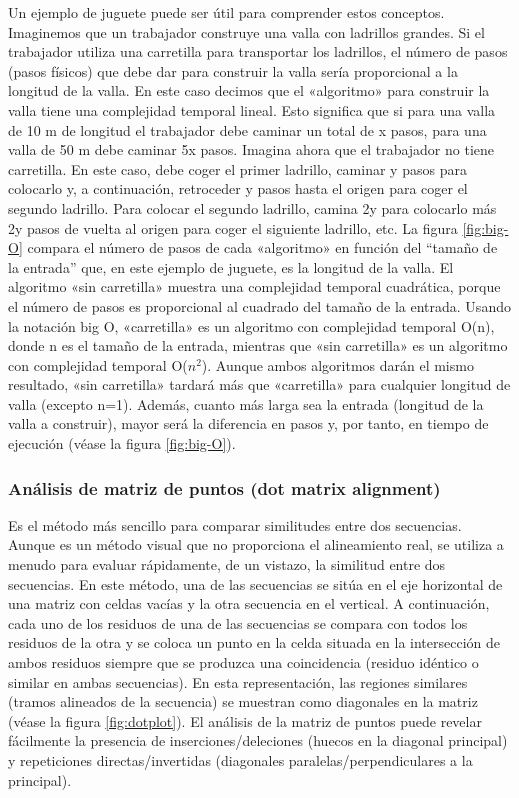 Un ejemplo de juguete puede ser útil para comprender estos conceptos. Imaginemos que un trabajador construye una valla con ladrillos grandes. Si el trabajador utiliza una carretilla para transportar los ladrillos, el número de pasos (pasos físicos) que debe dar para construir la valla sería proporcional a la longitud de la valla. En este caso decimos que el «algoritmo» para construir la valla tiene una complejidad temporal lineal. Esto significa que si para una valla de 10 m de longitud el trabajador debe caminar un total de x pasos, para una valla de 50 m debe caminar 5x pasos. Imagina ahora que el trabajador no tiene carretilla. En este caso, debe coger el primer ladrillo, caminar y pasos para colocarlo y, a continuación, retroceder y pasos hasta el origen para coger el segundo ladrillo. Para colocar el segundo ladrillo, camina 2y para colocarlo más 2y pasos de vuelta al origen para coger el siguiente ladrillo, etc. La figura \ref{fig:big-O} compara el número de pasos de cada «algoritmo» en función del “tamaño de la entrada” que, en este ejemplo de juguete, es la longitud de la valla. El algoritmo «sin carretilla» muestra una complejidad temporal cuadrática, porque el número de pasos es proporcional al cuadrado del tamaño de la entrada. Usando la notación big O, «carretilla» es un algoritmo con complejidad temporal O(n), donde n es el tamaño de la entrada, mientras que «sin carretilla» es un algoritmo con complejidad temporal O($n^2$). Aunque ambos algoritmos darán el mismo resultado, «sin carretilla» tardará más que «carretilla» para cualquier longitud de valla (excepto n=1). Además, cuanto más larga sea la entrada (longitud de la valla a construir), mayor será la diferencia en pasos y, por tanto, en tiempo de ejecución (véase la figura \ref{fig:big-O}).

\subsubsection{Análisis de matriz de puntos (dot matrix alignment)}
Es el método más sencillo para comparar similitudes entre dos secuencias. Aunque es un método visual que no proporciona el alineamiento real, se utiliza a menudo para evaluar rápidamente, de un vistazo, la similitud entre dos secuencias. En este método, una de las secuencias se sitúa en el eje horizontal de una matriz con celdas vacías y la otra secuencia en el vertical. A continuación, cada uno de los residuos de una de las secuencias se compara con todos los residuos de la otra y se coloca un punto en la celda situada en la intersección de ambos residuos siempre que se produzca una coincidencia (residuo idéntico o similar en ambas secuencias). En esta representación, las regiones similares (tramos alineados de la secuencia) se muestran como diagonales en la matriz (véase la figura \ref{fig:dotplot}). El análisis de la matriz de puntos puede revelar fácilmente la presencia de inserciones/deleciones (huecos en la diagonal principal) y repeticiones directas/invertidas (diagonales paralelas/perpendiculares a la principal).

